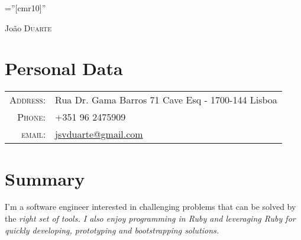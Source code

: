 \documentclass[a4paper,10pt]{article}
\begin{document}
\pagestyle{empty} %

\font\fb=''[cmr10]'' %

\par{\centering
  {\Huge João \textsc{Duarte}
}\bigskip\par}

\section{Personal Data}

\begin{tabular}{rl}
    \textsc{Address:}   & Rua Dr. Gama Barros 71 Cave Esq - 1700-144 Lisboa\\
    \textsc{Phone:}     & +351 96 2475909\\
    \textsc{email:}     & \href{mailto:jsvduarte@gmail.com}{jsvduarte@gmail.com} \\
\end{tabular}

\section{Summary}
I'm a software engineer interested in challenging problems that can be solved by
the \it{right set of tools}. I also enjoy programming in Ruby and leveraging Ruby for quickly
developing, prototyping and bootstrapping solutions.

\end{document}
